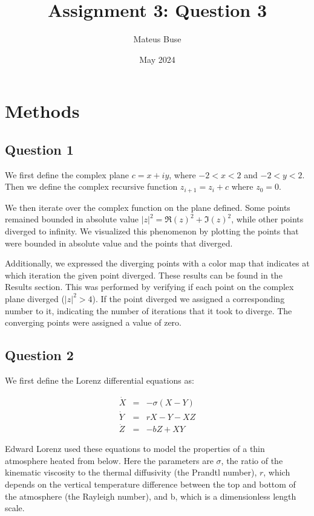 \documentclass{article}
\title{Assignment 3: Question 3}
\author{Mateus Buse}
\date{May 2024}
\begin{document}
\maketitle

\section{Methods}
\subsection{Question 1}

We first define the complex plane $c = x + iy$,
where $-2 < x < 2$ and $-2 < y < 2$. Then we define the complex recursive function $z_{i+1} = z_{i} + c$ where $z_{0} = 0$.

We then iterate over the complex function on the plane defined. Some points remained bounded in absolute value $|z|^2 = \Re(z)^2 + \Im(z)^2$, while other points diverged to infinity. We visualized this phenomenon by plotting the points that were bounded in absolute value and the points that diverged.

Additionally, we expressed the diverging points with a color map that indicates at which iteration the given point diverged. These results can be found in the Results section. This was performed by verifying if each point on the complex plane diverged ($|z|^2 > 4$). If the point diverged we assigned a corresponding number to it, indicating the number of iterations that it took to diverge. The converging points were assigned a value of zero.
        
\subsection{Question 2}

We first define the Lorenz differential equations as:

\begin{eqnarray}
\dot X &=& -\sigma(X-Y)\\
\dot Y &=& rX -Y - XZ\\
\dot Z &=& -bZ + XY
\end{eqnarray}

Edward Lorenz used these equations to model the properties of a thin atmosphere heated from below. Here the parameters are $\sigma$, the ratio of the kinematic viscosity to the thermal diffusivity (the Prandtl number),  $r$, which depends on the vertical temperature difference between the top and bottom of the atmosphere (the Rayleigh number), and b, which is a dimensionless length scale.
\end{document}
